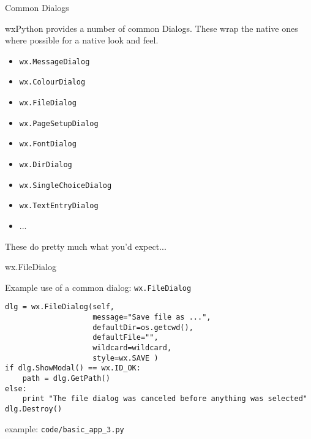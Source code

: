 \documentclass{beamer}
\begin{document}
\begin{frame}[fragile]{Common Dialogs}

\vfill
{\Large wxPython provides a number of common Dialogs. These wrap the native ones where possible for a native look and feel.}

\begin{itemize}
 \item \verb`wx.MessageDialog`
 \item \verb`wx.ColourDialog`
 \item \verb`wx.FileDialog`
 \item \verb`wx.PageSetupDialog`
 \item \verb`wx.FontDialog`
 \item \verb`wx.DirDialog`
 \item \verb`wx.SingleChoiceDialog`
 \item \verb`wx.TextEntryDialog`
 \item ...
\end{itemize}

\vfill
{\Large These do pretty much what you'd expect...}

\end{frame}

\begin{frame}[fragile]{wx.FileDialog}

\vfill
{\Large Example use of a common dialog: \verb`wx.FileDialog`}\\

\begin{verbatim}
dlg = wx.FileDialog(self,
                    message="Save file as ...",
                    defaultDir=os.getcwd(), 
                    defaultFile="",
                    wildcard=wildcard,
                    style=wx.SAVE )
if dlg.ShowModal() == wx.ID_OK:
    path = dlg.GetPath()
else:
    print "The file dialog was canceled before anything was selected"
dlg.Destroy()
\end{verbatim}

\vfill
example: \verb`code/basic_app_3.py`
\end{frame}
\end{document}
